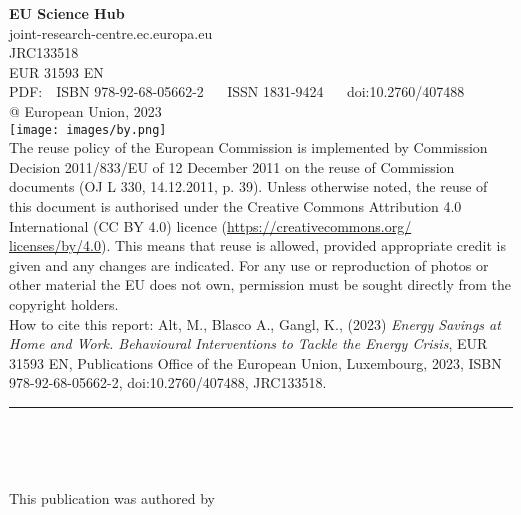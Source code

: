 {\begin{titlepage}
        \textbf{EU Science Hub}\\
        joint-research-centre.ec.europa.eu\\
        
        
        {JRC133518}\\
        {EUR 31593 EN}\\
        
        PDF: \,\, ISBN 978-92-68-05662-2 \,\,\,\,\,\,
        ISSN 1831-9424 \,\,\,\,\,\,
        doi:10.2760/407488\\

        {@ European Union, 2023}\\ 

        \texttt{[image: images/by.png]}\\

        The reuse policy of the European Commission is implemented by Commission Decision 2011/833/EU of 12 December 2011 on the reuse of Commission documents (OJ L 330, 14.12.2011, p. 39). Unless otherwise noted, the reuse of this document is authorised under the Creative Commons Attribution 4.0 International (CC BY 4.0) licence (\url{https://creativecommons.org/ licenses/by/4.0}). This means that reuse is allowed, provided appropriate credit is given and any changes are indicated. For any use or reproduction of photos or other material the EU does not own, permission must be sought directly from the copyright holders.\\

        How to cite this report: Alt, M., Blasco A., Gangl, K., (2023) \emph{Energy Savings at Home and Work. Behavioural Interventions to Tackle the Energy Crisis}, EUR 31593 EN, Publications Office of the European Union, Luxembourg, 2023, ISBN 978-92-68-05662-2, doi:10.2760/407488, JRC133518.

        \clearpage 
        \topskip=120pt
        \begin{center}
            \hfill\parbox{1\textwidth}{%
                \rule{\linewidth}{0.5mm} \\[0.4cm]
                \begin{spacing}{2.5}
                \textbf{\color{gray}\Huge\@title}
                \end{spacing}
            }\\
            \vspace{60pt}
            {\Large\@date}
        \end{center}
    
        \vfill
        This publication was authored by \@author

    \end{titlepage}
}
\makeatother